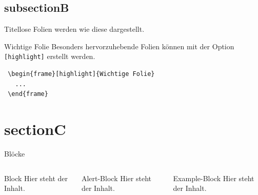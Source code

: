 \documentclass{beamer}
\begin{document}
\subsection{subsectionB}

\begin{frame}
  Titellose Folien werden wie diese dargestellt.
\end{frame}

\begin{frame}{Wichtige Folie}
Besonders hervorzuhebende Folien können mit der Option
{\color{tuRed}\lstinline{[highlight]}} erstellt werden.
\begin{lstlisting}
 \begin{frame}[highlight]{Wichtige Folie}
   ...
 \end{frame}
\end{lstlisting}
\end{frame}


\section{sectionC}
\begin{frame}{Blöcke}
  \begin{columns}[onlytextwidth]
    \begin{column}{0.3\textwidth}
      \begin{block}{Block}
        Hier steht der Inhalt.
      \end{block}
    \end{column}
    \begin{column}{0.3\textwidth}
      \begin{alertblock}{Alert-Block}
        Hier steht der Inhalt.
      \end{alertblock}
    \end{column}
    \begin{column}{0.3\textwidth}
      \begin{exampleblock}{Example-Block}
        Hier steht der Inhalt.
      \end{exampleblock}     
    \end{column}
  \end{columns}
\end{frame}
\end{document}

